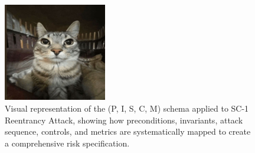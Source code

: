 \begin{figure}[H]
\centering
\includegraphics[width=0.4\textwidth]{../figure/fig1.png}
\caption{Visual representation of the (P, I, S, C, M) schema applied to SC-1 Reentrancy Attack, showing how preconditions, invariants, attack sequence, controls, and metrics are systematically mapped to create a comprehensive risk specification.}
\label{fig:schema_blueprint}
\end{figure}
